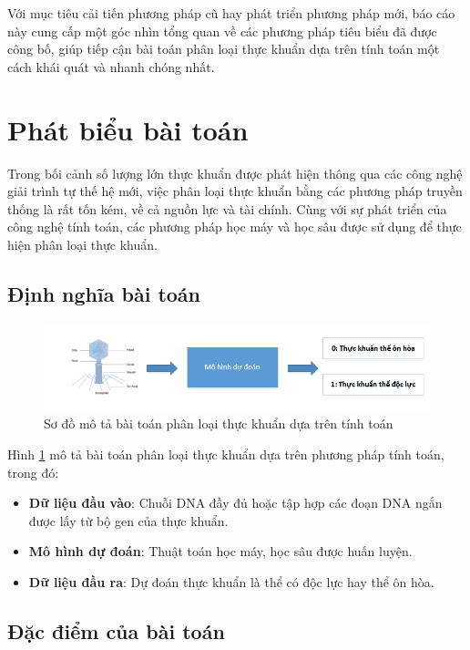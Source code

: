 Với mục tiêu cải tiến phương pháp cũ hay phát triển phương pháp mới, báo cáo này cung cấp một góc nhìn tổng quan về các phương pháp tiêu biểu đã được công bố, giúp tiếp cận bài toán phân loại thực khuẩn dựa trên tính toán một cách khái quát và nhanh chóng nhất.

\section{Phát biểu bài toán}

Trong bối cảnh số lượng lớn thực khuẩn được phát hiện thông qua các công nghệ giải trình tự thế hệ mới, việc phân loại thực khuẩn bằng các phương pháp truyền thống là rất tốn kém, về cả nguồn lực và tài chính. Cùng với sự phát triển của công nghệ tính toán, các phương pháp học máy và học sâu được sử dụng để thực hiện phân loại thực khuẩn.

\subsection{Định nghĩa bài toán}
\begin{figure}[H]
    \centering
    \includegraphics[width=1\linewidth]{figures/problem.png}
    \caption{Sơ đồ mô tả bài toán phân loại thực khuẩn dựa trên tính toán}
    \label{fig:problem}
\end{figure}

Hình \ref{fig:problem} mô tả bài toán phân loại thực khuẩn dựa trên phương pháp tính toán, trong đó:
\begin{itemize}
    \item \textbf{Dữ liệu đầu vào}: Chuỗi DNA đầy đủ hoặc tập hợp các đoạn DNA ngắn được lấy từ bộ gen của thực khuẩn.
    \item \textbf{Mô hình dự đoán}: Thuật toán học máy, học sâu được huấn luyện.
    \item \textbf{Dữ liệu đầu ra}: Dự đoán thực khuẩn là thể có độc lực hay thể ôn hòa.
\end{itemize}

\subsection{Đặc điểm của bài toán}

